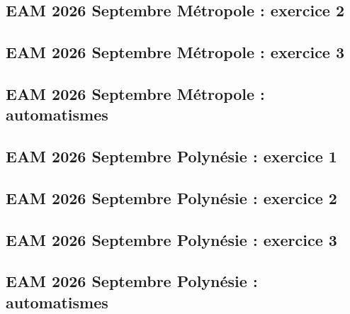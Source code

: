 \documentclass[lang=fr,edition=teacher,layout=sheet]{mxbook}
\begin{document}
\par\bigskip
{}\subsection*{EAM 2026 Septembre Métropole : exercice 2}
\begingroup\endgroup
\par\bigskip
{}\subsection*{EAM 2026 Septembre Métropole : exercice 3}
\begingroup\endgroup
\par\bigskip
{}\subsection*{EAM 2026 Septembre Métropole : automatismes}
\begingroup\endgroup
\par\bigskip
{}\subsection*{EAM 2026 Septembre Polynésie : exercice 1}
\begingroup\endgroup
\par\bigskip
{}\subsection*{EAM 2026 Septembre Polynésie : exercice 2}
\begingroup\endgroup
\par\bigskip
{}\subsection*{EAM 2026 Septembre Polynésie : exercice 3}
\begingroup\endgroup
\par\bigskip
{}\subsection*{EAM 2026 Septembre Polynésie : automatismes}
\end{document}
